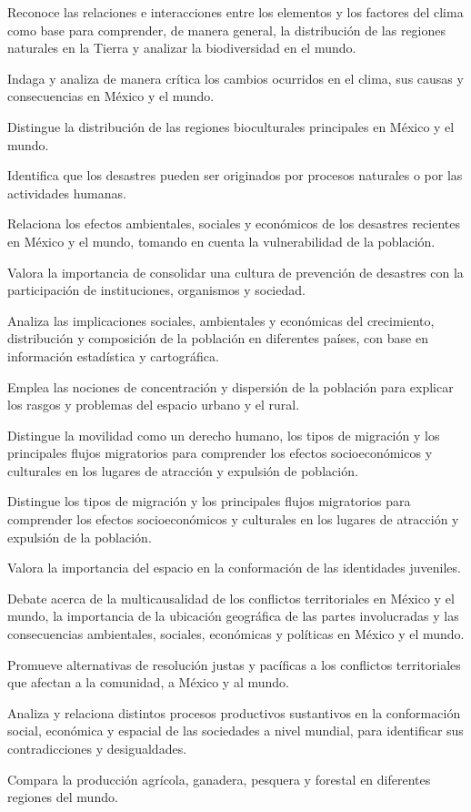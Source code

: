 \item Reconoce las relaciones e interacciones entre los elementos y los factores del clima como base para comprender, de manera general, la distribución de las regiones naturales en la Tierra y analizar la biodiversidad en el mundo.
\item Indaga y analiza de manera crítica los cambios ocurridos en el clima, sus causas y consecuencias en México y el mundo.
\item Distingue la distribución de las regiones bioculturales principales en México y el mundo.
\item Identifica que los desastres pueden ser originados por procesos naturales o por las actividades humanas. 
\item Relaciona los efectos ambientales, sociales y económicos de los desastres recientes en México y el mundo, tomando en cuenta la vulnerabilidad de la población.
\item Valora la importancia de consolidar una cultura de prevención de desastres con la participación de instituciones, organismos y sociedad. 
\item Analiza las implicaciones sociales, ambientales y económicas del crecimiento, distribución y composición de la población en diferentes países, con base en información estadística y cartográfica. 
\item Emplea las nociones de concentración y dispersión de la población para explicar los rasgos y problemas del espacio urbano y el rural.
\item Distingue la movilidad como un derecho humano, los tipos de migración y los principales flujos migratorios para comprender los efectos socioeconómicos y culturales en los lugares de atracción y expulsión de población.
\item Distingue los tipos de migración y los principales flujos migratorios para comprender los efectos socioeconómicos y culturales en los lugares de atracción y expulsión de la población.
\item Valora la importancia del espacio en la conformación de las identidades juveniles.
\item Debate acerca de la multicausalidad de los conflictos territoriales en México y el mundo, la importancia de la ubicación geográfica de las partes involucradas y las consecuencias ambientales, sociales, económicas y políticas en México y el mundo.
\item Promueve alternativas de resolución justas y pacíficas a los conflictos territoriales que afectan a la comunidad, a México y al mundo.
\item Analiza y relaciona distintos procesos productivos sustantivos en la conformación social, económica y espacial de las sociedades a nivel mundial, para identificar sus contradicciones y desigualdades.
\item Compara la producción agrícola, ganadera, pesquera y forestal en diferentes regiones del mundo.